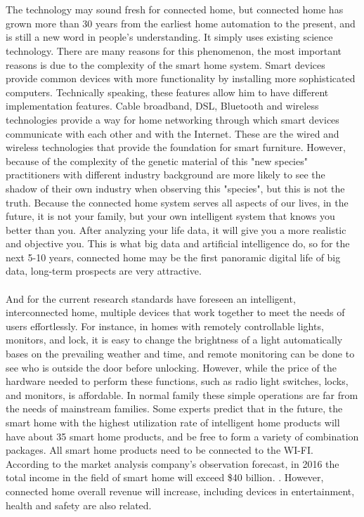 \documentclass[report]{IEEEtran}
\begin{document}
\\\\The technology may sound fresh for connected home, but connected home has grown more than 30 years from the earliest home automation to the present, and is still a new word in people's understanding. It simply uses existing science technology. There are many reasons for this phenomenon, the most important reasons is due to the complexity of the smart home system. Smart devices provide common devices with more functionality by installing more sophisticated computers. Technically speaking, these features allow him to have different implementation features. Cable broadband, DSL, Bluetooth and wireless technologies provide a way for home networking through which smart devices communicate with each other and with the Internet. These are the wired and wireless technologies that provide the foundation for smart furniture. However, because of the complexity of the genetic material of this "new species" practitioners with different industry background are more likely to see the shadow of their own industry when observing this "species", but this is not the truth. Because the connected home system serves all aspects of our lives, in the future, it is not your family, but your own intelligent system that knows you better than you. After analyzing your life data, it will give you a more realistic and objective you. This is what big data and artificial intelligence do, so for the next 5-10 years, connected home may be the first panoramic digital life of big data, long-term prospects are very attractive.
\\\\ And for the current research standards have foreseen an intelligent, interconnected home, multiple devices that work together to meet the needs of users effortlessly. For instance, in homes with remotely controllable lights, monitors, and lock, it is easy to change the brightness of a light automatically bases on the prevailing weather and time, and remote monitoring can be done to see who is outside the door before unlocking. However, while the price of the hardware needed to perform these functions, such as radio light switches, locks, and monitors, is affordable. In normal family these simple operations are far from the needs of mainstream families. Some experts predict that in the future, the smart home with the highest utilization rate of intelligent home products will have about 35 smart home products, and be free to form a variety of combination packages. All smart home products need to be connected to the WI-FI. According to the market analysis company's observation forecast, in 2016 the total income in the field of smart home will exceed \$40 billion. \cite{3}.  However, connected home overall revenue will increase, including devices in entertainment, health and safety are also related.
\end{document}
